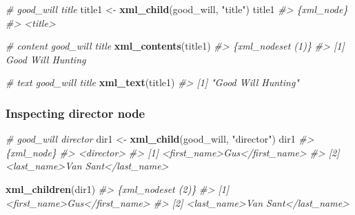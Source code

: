 \documentclass[
]{book}
\newenvironment{Shaded}{\begin{snugshade}}{\end{snugshade}}
\newcommand{\CommentTok}[1]{\textcolor[rgb]{0.56,0.35,0.01}{\textit{#1}}}
\newcommand{\FunctionTok}[1]{\textcolor[rgb]{0.13,0.29,0.53}{\textbf{#1}}}
\newcommand{\NormalTok}[1]{#1}
\newcommand{\OtherTok}[1]{\textcolor[rgb]{0.56,0.35,0.01}{#1}}
\newcommand{\StringTok}[1]{\textcolor[rgb]{0.31,0.60,0.02}{#1}}
\begin{document}
\begin{Shaded}
\begin{Highlighting}[]
\CommentTok{\# good\_will title}
\NormalTok{title1 }\OtherTok{\textless{}{-}} \FunctionTok{xml\_child}\NormalTok{(good\_will, }\StringTok{"title"}\NormalTok{)}
\NormalTok{title1}
\CommentTok{\#\textgreater{} \{xml\_node\}}
\CommentTok{\#\textgreater{} \textless{}title\textgreater{}}

\CommentTok{\# content good\_will title}
\FunctionTok{xml\_contents}\NormalTok{(title1)}
\CommentTok{\#\textgreater{} \{xml\_nodeset (1)\}}
\CommentTok{\#\textgreater{} [1] Good Will Hunting}

\CommentTok{\# text good\_will title}
\FunctionTok{xml\_text}\NormalTok{(title1)}
\CommentTok{\#\textgreater{} [1] "Good Will Hunting"}
\end{Highlighting}
\end{Shaded}

\hypertarget{inspecting-director-node}{%
\subsubsection{Inspecting director node}\label{inspecting-director-node}}

\begin{Shaded}
\begin{Highlighting}[]
\CommentTok{\# good\_will director}
\NormalTok{dir1 }\OtherTok{\textless{}{-}} \FunctionTok{xml\_child}\NormalTok{(good\_will, }\StringTok{"director"}\NormalTok{)}
\NormalTok{dir1}
\CommentTok{\#\textgreater{} \{xml\_node\}}
\CommentTok{\#\textgreater{} \textless{}director\textgreater{}}
\CommentTok{\#\textgreater{} [1] \textless{}first\_name\textgreater{}Gus\textless{}/first\_name\textgreater{}}
\CommentTok{\#\textgreater{} [2] \textless{}last\_name\textgreater{}Van Sant\textless{}/last\_name\textgreater{}}
\end{Highlighting}
\end{Shaded}

\begin{Shaded}
\begin{Highlighting}[]
\FunctionTok{xml\_children}\NormalTok{(dir1)}
\CommentTok{\#\textgreater{} \{xml\_nodeset (2)\}}
\CommentTok{\#\textgreater{} [1] \textless{}first\_name\textgreater{}Gus\textless{}/first\_name\textgreater{}}
\CommentTok{\#\textgreater{} [2] \textless{}last\_name\textgreater{}Van Sant\textless{}/last\_name\textgreater{}}
\end{Highlighting}
\end{Shaded}
\end{document}
